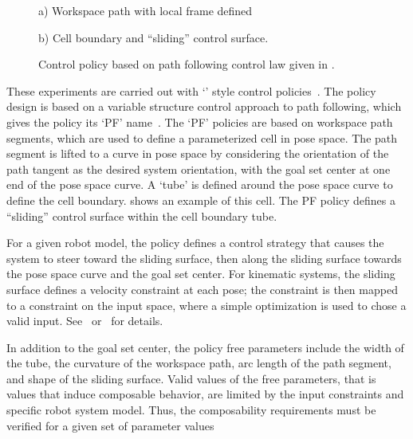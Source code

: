 \begin{figure}[bt]
\begin{center}
\begin{minipage}[b]{0.98\linewidth}
\begin{minipage}[b]{\linewidth}
\begin{minipage}[t]{0.48\linewidth}
   {\footnotesize a) Workspace path with local frame defined }

\end{minipage}
\hspace{0.02\linewidth} %
\begin{minipage}[t]{0.48\linewidth}
  \centering   

  {\footnotesize b) Cell boundary and ``sliding'' control surface.}  

\end{minipage}

\end{minipage}
\end{minipage}
\caption[Path following style policy]{Control policy based on path following control
  law given in \cite{vsc_path_following}.}
\label{fig:nonholo_PF_policy}
\end{center}
\end{figure}

These experiments are carried out with `\PF' style control
policies~\cite{dcc_thesis,conner_09}.  The policy design is based on a
variable structure control approach to path following, which gives the
policy its `PF' name~\cite{vsc_path_following}.  The `PF' policies are
based on workspace path segments, which are used to define a
parameterized cell in pose space.  The path segment is lifted to a
curve in pose space by considering the orientation of the path tangent
as the desired system orientation, with the goal set center at one end
of the pose space curve.  A `tube' is defined around the pose space
curve to define the cell boundary.   shows an
example of this cell.  The PF policy defines a ``sliding'' control
surface within the cell boundary tube.

For a given robot model, the policy defines a control strategy that
causes the system to steer toward the sliding surface, then along the
sliding surface towards the pose space curve and the goal set center.
For kinematic systems, the sliding surface defines a velocity
constraint at each pose; the constraint is then mapped to a constraint
on the input space, where a simple optimization is used to chose a
valid input.  See~\cite{dcc_thesis} or~\cite{conner_09} for details.


In addition to the goal set center, the policy free parameters include
the width of the tube, the curvature of the workspace path, arc length
of the path segment, and shape of the sliding surface.  Valid values
of the free parameters, that is values that induce composable
behavior, are limited by the input constraints and specific robot
system model.  Thus, the composability requirements must be verified
for a given set of parameter values


